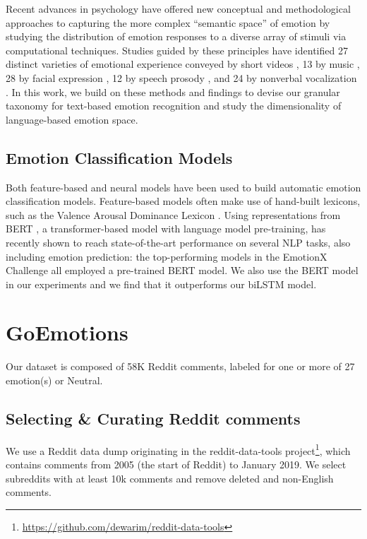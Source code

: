 \documentclass[11pt,a4paper]{article}
\begin{document}
Recent advances in psychology have offered new conceptual and methodological approaches to capturing the more complex ``semantic space'' of emotion \citep{cowen2019mapping} by studying the distribution of emotion responses to a diverse array of stimuli via computational techniques. Studies guided by these principles have identified 27 distinct varieties of emotional experience conveyed by short videos \cite{cowen2017self}, 13 by music \cite{cowen2019music}, 28 by facial expression \cite{cowen2019face}, 12 by speech prosody \cite{cowen2019primacy}, and 24 by nonverbal vocalization \cite{cowen2018mapping}. In this work, we build on these methods and findings to devise our granular taxonomy for text-based emotion recognition and study the dimensionality of language-based emotion space.

\subsection{Emotion Classification Models}
Both feature-based and neural models have been used to build automatic emotion classification models. Feature-based models often make use of hand-built lexicons, such as the Valence Arousal Dominance Lexicon \citep{mohammad2018obtaining}. Using representations from BERT \citep{devlin2019bert}, a transformer-based model with language model pre-training, has recently shown to reach state-of-the-art performance on several NLP tasks, also including emotion prediction: the top-performing models in the EmotionX Challenge \citep{hsu-ku-2018-socialnlp} all employed a pre-trained BERT model. We also use the BERT model in our experiments and we find that it outperforms our biLSTM model. \section{GoEmotions}
\label{sec:data_collection}

Our dataset is composed of 58K Reddit comments, labeled for one or more of 27 emotion(s) or Neutral.

\subsection{Selecting \& Curating Reddit comments}

We use a Reddit data dump originating in the reddit-data-tools project\footnote{\url{https://github.com/dewarim/reddit-data-tools}}, which contains comments from 2005 (the start of Reddit) to January 2019. We select subreddits with at least 10k comments and remove deleted and non-English comments.
\end{document}
